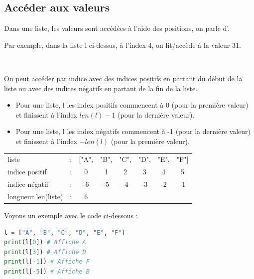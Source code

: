 \subsection*{Accéder aux valeurs}
Dans une liste, les valeurs sont accédées à l'aide des positions, on parle d'.

\begin{Comprendre}
    \begin{minipage}{0.45\linewidth}
    Par exemple, dans la liste l ci-dessus, à l'index 4, on lit/accède à la valeur 31. 
\end{minipage}\begin{minipage}{0.49\linewidth}
    \begin{center}
       
    \end{center}
\end{minipage}\\
\end{Comprendre}

On peut accéder par indice avec des indices positifs en partant du début de la liste ou avec des indices négatifs en partant de la fin de la liste.
\begin{itemize}
    \item Pour une liste, l les index positifs commencent à 0 (pour la première valeur) et finissent à l'index $len(l) - 1$ (pour la dernière valeur).
    \item Pour une liste, l les index négatifs commencent à -1 (pour la dernière valeur) et finissent à l'index $-len(l)$ (pour la première valeur).
\end{itemize}

\begin{center}
\begin{tabular}{l c c c c c c c}
    liste & : &["A", & "B", & "C", & "D", & "E", &"F"]\\
    indice positif & : & 0 & 1 & 2 & 3 & 4 & 5\\
    indice négatif & : & -6 & -5 & -4 & -3 & -2 & -1\\
    longueur len(liste)& : & 6 \\
\end{tabular}
\end{center}

Voyons un exemple avec le code ci-dessous :
\begin{lstlisting}[style=pythonstyle, language=python]
l = ["A", "B", "C", "D", "E", "F"]
print(l[0]) # Affiche A
print(l[3]) # Affiche D
print(l[-1]) # Affiche F
print(l[-5]) # Affiche B
\end{lstlisting}

